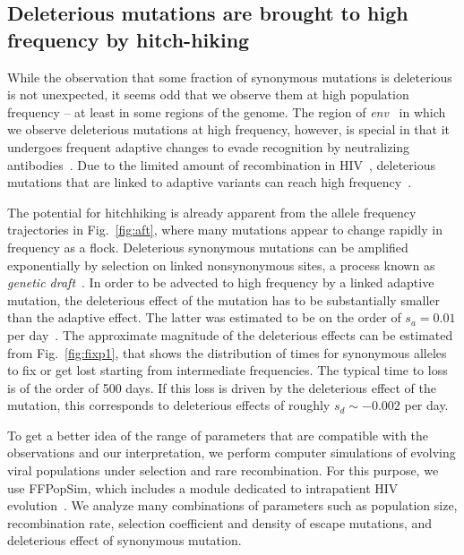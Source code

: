 \documentclass[rmp, twocolumn]{revtex4}
\newcommand{\FIG}[1]{Fig.~\ref{fig:#1}}
\newcommand{\env}{\textit{env}}
\begin{document}
\subsection{Deleterious mutations are brought to high frequency by hitch-hiking}

While the observation that some fraction of synonymous mutations is deleterious
is not unexpected, it seems odd that we observe them at high population
frequency -- at least in some regions of the genome. The region of \env~ in
which we observe deleterious mutations at high frequency, however, is special in
that it undergoes frequent adaptive changes to evade recognition by neutralizing
antibodies~\cite{williamson_adaptation_2003}. Due to the limited amount of
recombination in HIV~\cite{neher_recombination_2010,batorsky_estimate_2011},
deleterious mutations that are linked to adaptive variants can reach high
frequency~\citep{smith_hitch-hiking_1974}.

The potential for hitchhiking is already apparent from the allele frequency
trajectories in \FIG{aft}, where many mutations appear to change rapidly in
frequency as a flock. Deleterious synonymous mutations can be amplified
exponentially by selection on linked nonsynonymous sites, a process known as
{\it genetic draft}~\citep{gillespie_genetic_2000, neher_genetic_2011}. In order
to be advected to high frequency by a linked adaptive mutation, the deleterious
effect of the mutation has to be substantially smaller than the adaptive effect.
The latter was estimated to be on the order of $s_a = 0.01$ per day~\citep{neher_recombination_2010}.
The approximate magnitude of the deleterious effects can be estimated from
\FIG{fixp1}, that shows the distribution of times for synonymous
alleles to fix or get lost starting from intermediate frequencies. The
typical time to loss is of the order of 500 days. If this loss is driven by the
deleterious effect of the mutation, this corresponds to deleterious effects of
roughly $s_d \sim - 0.002$ per day.

To get a better idea of the range of parameters that are compatible with the
observations and our interpretation, we  perform computer simulations of
evolving viral populations under selection and rare recombination. For this
purpose, we use FFPopSim, which includes a module
dedicated to intrapatient HIV evolution~\citep{zanini_ffpopsim:_2012}. We
analyze many combinations of parameters such as population size, recombination
rate, selection coefficient and density of escape mutations, and deleterious effect
of synonymous mutation.
\end{document}
